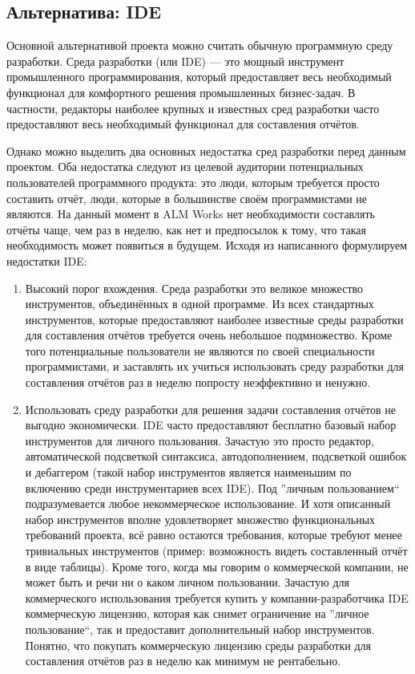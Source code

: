 \documentclass[12pt]{article}
\begin{document}
    \subsection{Альтернатива: IDE}
    Основной альтернативой проекта можно считать обычную программную среду разработки.
    Среда разработки (или IDE) --- это мощный инструмент промышленного программирования, который предоставляет весь необходимый функционал
    для комфортного решения промышленных бизнес-задач. В частности, редакторы наиболее крупных и известных сред разработки часто предоставляют
    весь необходимый функционал для составления отчётов.

    Однако можно выделить два основных недостатка сред разработки перед данным проектом. Оба недостатка следуют из целевой аудитории потенциальных
    пользователей программного продукта: это люди, которым требуется просто составить отчёт, люди, которые в большинстве своём программистами не
    являются. На данный момент в ALM Works нет необходимости составлять отчёты чаще, чем раз в неделю, как нет и предпосылок к тому, что такая
    необходимость может появиться в будущем. Исходя из написанного формулируем недостатки IDE:
    \begin{enumerate}
        \item Высокий порог вхождения. Среда разработки это великое множество инструментов, объединённых в одной программе. Из всех стандартных
        инструментов, которые предоставляют наиболее известные среды разработки для составления отчётов требуется очень небольшое подмножество.
        Кроме того потенциальные пользователи не являются по своей специальности программистами, и заставлять их учиться использовать среду
        разработки для составления отчётов раз в неделю попросту неэффективно и ненужно.
        \item Использовать среду разработки для решения задачи составления отчётов не выгодно экономически. IDE часто предоставляют бесплатно базовый
        набор инструментов для личного пользования. Зачастую это просто редактор, автоматической подсветкой синтаксиса, автодополнением, подсветкой ошибок
        и дебаггером (такой набор инструментов является наименьшим по включению среди инструментариев всех IDE). Под ''личным пользованием`` подразумевается
        любое некоммерческое использование. И хотя описанный набор инструментов вполне удовлетворяет множество функциональных требований проекта, всё равно
        остаются требования, которые требуют менее тривиальных инструментов (пример: возможность видеть составленный отчёт в виде таблицы). Кроме того,
        когда мы говорим о коммерческой компании, не может быть и речи ни о каком личном пользовании. Зачастую для коммерческого использования требуется купить
        у компании-разработчика IDE коммерческую лицензию, которая как снимет ограничение на ''личное пользование``, так и предоставит дополнительный набор
        инструментов. Понятно, что покупать коммерческую лицензию среды разработки для составления отчётов раз в неделю как минимум не рентабельно.
    \end{enumerate}
\end{document}
